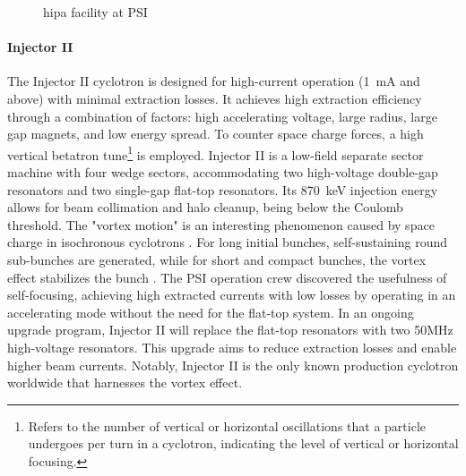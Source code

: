 \begin{refsection}
\begin{figure}
            \caption{\acrfull{hipa} facility at PSI}
            \label{fig:PSI:HIPA}
        \end{figure}
        
        \paragraph{Injector II}  
        The Injector II cyclotron is designed for high-current operation (\SI{1}{mA} and above) with minimal extraction losses. 
        It achieves high extraction efficiency through a combination of factors: high accelerating voltage, large radius, large gap magnets, and low energy spread. 
        To counter space charge forces, a high vertical betatron tune\footnote{Refers to the number of vertical or horizontal oscillations that a particle undergoes per turn in a cyclotron, indicating the level of vertical or horizontal focusing.} is employed. 
        Injector II is a low-field separate sector machine with four wedge sectors, accommodating two high-voltage double-gap resonators and two single-gap flat-top resonators. 
        Its \SI{870}{keV} injection energy allows for beam collimation and halo cleanup, being below the Coulomb threshold.
        The "vortex motion" is an interesting phenomenon caused by space charge in isochronous cyclotrons \cite{vortexeffect}. 
        For long initial bunches, self-sustaining round sub-bunches are generated, while for short and compact bunches, the vortex effect stabilizes the bunch \cite{vortexeffect:longitudinal} \cite{vortexeffect:transverse}. 
        The PSI operation crew discovered the usefulness of self-focusing, achieving high extracted currents with low losses by operating in an accelerating mode without the need for the flat-top system. 
        In an ongoing upgrade program, Injector II will replace the flat-top resonators with two 50MHz high-voltage resonators. 
        This upgrade aims to reduce extraction losses and enable higher beam currents. 
        Notably, Injector II is the only known production cyclotron worldwide that harnesses the vortex effect.


\end{refsection}
